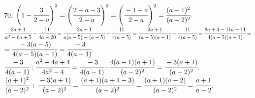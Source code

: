 70. $\left(1-\cfrac{3}{2-a}\right)^2=\left(\cfrac{2-a-3}{2-a}\right)^2=\left(\cfrac{-1-a}{2-a}\right)^2=\cfrac{(a+1)^2}{(a-2)^2}.$\\
$\cfrac{2a+1}{a^2-6a+5}-\cfrac{11}{4a-20}=\cfrac{2a+1}{a(a-5)-(a-5)}-\cfrac{11}{4(a-5)}=\cfrac{2a+1}{(a-5)(a-1)}-\cfrac{11}{4(a-5)}=
\cfrac{8a+4-11a+11}{4(a-5)(a-1)}=$\\$=\cfrac{-3(a-5)}{4(a-5)(a-1)}=\cfrac{-3}{4(a-1)}.$\\
$\cfrac{-3}{4(a-1)}:\cfrac{a^2-4a+4}{4a^2-4}=\cfrac{-3}{4(a-1)}\cdot\cfrac{4(a-1)(a+1)}{(a-2)^2}=\cfrac{-3(a+1)}{(a-2)^2}.$\\
$\cfrac{(a+1)^2}{(a-2)^2}+\cfrac{-3(a+1)}{(a-2)^2}=\cfrac{(a+1)(a+1-3)}{(a-2)^2}=\cfrac{(a+1)(a-2)}{(a-2)^2}=\cfrac{a+1}{a-2}.$\\
